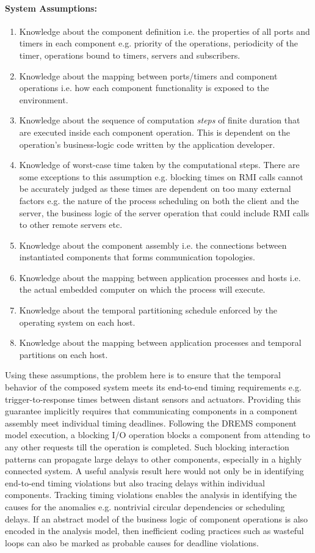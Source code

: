 \paragraph{System Assumptions:}
\begin{enumerate}
	\item Knowledge about the component definition i.e. the properties of all ports and timers in each component e.g. priority of the operations, periodicity of the timer, operations bound to timers, servers and subscribers. 
	\item Knowledge about the mapping between ports/timers and component operations i.e. how each component functionality is exposed to the environment.
	\item Knowledge about the sequence of computation \emph{steps} of finite duration that are executed inside each component operation. This is dependent on the operation's business-logic code written by the application developer.	
	\item Knowledge of worst-case time taken by the computational steps. There are some exceptions to this assumption e.g. blocking times on RMI calls cannot be accurately judged as these times are dependent on too many external factors e.g. the nature of the process scheduling on both the client and the server, the business logic of the server operation that could include RMI calls to other remote servers etc.
	\item Knowledge about the component assembly i.e. the connections between instantiated components that forms communication topologies.
	\item Knowledge about the mapping between application processes and hosts i.e. the actual embedded computer on which the process will execute.
	\item Knowledge about the temporal partitioning schedule enforced by the operating system on each host.
	\item Knowledge about the mapping between application processes and temporal partitions on each host.
\end{enumerate}

Using these assumptions, the problem here is to ensure that the temporal behavior of the composed system meets its end-to-end timing requirements e.g. trigger-to-response times between distant sensors and actuators. Providing this guarantee implicitly requires that communicating components in a component assembly meet individual timing deadlines. Following the DREMS component model execution, a blocking I/O operation blocks a component from attending to any other requests till the operation is completed. Such blocking interaction patterns can propagate large delays to other components, especially in a highly connected system. A useful analysis result here would not only be in identifying end-to-end timing violations but also tracing delays within individual components. Tracking timing violations enables the analysis in identifying the causes for the anomalies e.g. nontrivial circular dependencies or scheduling delays. If an abstract model of the business logic of component operations is also encoded in the analysis model, then inefficient coding practices such as wasteful loops can also be marked as probable causes for deadline violations. 

